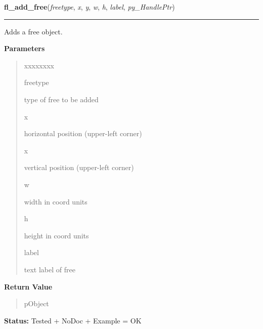     \label{xformslib:library:fl_add_free}

    \vspace{0.5ex}

\hspace{.8\funcindent}\begin{boxedminipage}{\funcwidth}

    \raggedright \textbf{fl\_add\_free}(\textit{freetype}, \textit{x}, \textit{y}, \textit{w}, \textit{h}, \textit{label}, \textit{py\_HandlePtr})

    \vspace{-1.5ex}

    \rule{\textwidth}{0.5\fboxrule}
\setlength{\parskip}{2ex}
    Adds a free object.

\setlength{\parskip}{1ex}
      \textbf{Parameters}
      \vspace{-1ex}

      \begin{quote}
        \begin{Ventry}{xxxxxxxx}

          \item[freetype]

          type of free to be added

          \item[x]

          horizontal position (upper-left corner)

          \item[x]

          vertical position (upper-left corner)

          \item[w]

          width in coord units

          \item[h]

          height in coord units

          \item[label]

          text label of free

        \end{Ventry}

      \end{quote}

      \textbf{Return Value}
    \vspace{-1ex}

      \begin{quote}
      pObject

      \end{quote}

\textbf{Status:} Tested + NoDoc + Example = OK



    \end{boxedminipage}

